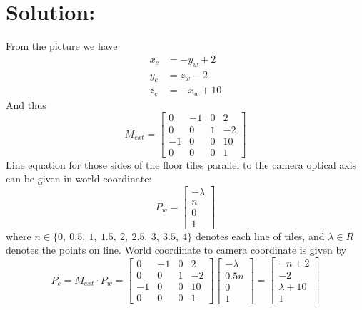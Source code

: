 \documentclass[12pt]{article}
\begin{document}
\vfill
\clearpage
\section{Solution:}
From the picture we have
\begin{equation*}
\begin{aligned}
x_c &= - y_w + 2\\
y_c &= z_w - 2\\
z_c &= - x_w + 10
\end{aligned}
\end{equation*}
And thus
\begin{equation*}
M_{ext} = \left[ \begin{array}{cccc}
0 & -1 & 0 & 2\\
0 & 0 & 1 & -2\\
-1 & 0 & 0 & 10\\
0 & 0 & 0 & 1
\end{array} \right ]
\end{equation*}
Line equation for those sides of the floor tiles parallel to the camera optical axis can be given in world coordinate:
\begin{equation*}
P_w = \left[ \begin{array}{c}
-\lambda\\
n\\
0\\
1
\end{array} \right ]
\end{equation*}
where $n \in \{ 0,\ 0.5,\ 1,\ 1.5,\ 2,\ 2.5,\ 3,\ 3.5,\ 4 \}$ denotes each line of tiles, and $\lambda \in R$ denotes the points on line. World coordinate to camera coordinate is given by
\begin{equation*}
P_c = M_{ext} \cdot P_w = \left[ \begin{array}{cccc}
0 & -1 & 0 & 2\\
0 & 0 & 1 & -2\\
-1 & 0 & 0 & 10\\
0 & 0 & 0 & 1
\end{array} \right ]\left[ \begin{array}{c}
-\lambda\\
0.5n\\
0\\
1
\end{array} \right ] = \left[ \begin{array}{c}
-n+2\\
-2\\
\lambda + 10\\
1
\end{array} \right ]
\end{equation*}
\end{document}
